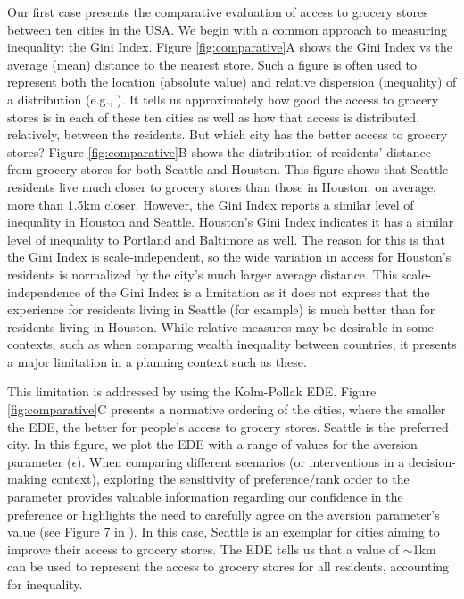 \documentclass[final,3p,times,onecolumn,sort&compress]{elsarticle}
\begin{document}
Our first case presents the comparative evaluation of access to grocery stores between ten cities in the USA.
We begin with a common approach to measuring inequality: the Gini Index.
Figure \ref{fig:comparative}A shows the Gini Index vs the average (mean) distance to the nearest store.
Such a figure is often used to represent both the location (absolute value) and relative dispersion (inequality) of a distribution (e.g., \cite{Adger1997-tu}).
It tells us approximately how good the access to grocery stores is in each of these ten cities as well as how that access is distributed, relatively, between the residents.
But which city has the better access to grocery stores?
Figure \ref{fig:comparative}B shows the distribution of residents' distance from grocery stores for both Seattle and Houston.
This figure shows that Seattle residents live much closer to grocery stores than those in Houston: on average, more than 1.5km closer. 
However, the Gini Index reports a similar level of inequality in Houston and Seattle.
Houston's Gini Index indicates it has a similar level of inequality to Portland and Baltimore as well.
The reason for this is that the Gini Index is scale-independent, so the wide variation in access for Houston's residents is normalized by the city's much larger average distance.
This scale-independence of the Gini Index is a limitation as it does not express that the experience for residents living in Seattle (for example) is much better than for residents living in Houston. 
While relative measures may be desirable in some contexts, such as when comparing wealth inequality between countries, it presents a major limitation in a planning context such as these.

This limitation is addressed by using the Kolm-Pollak EDE.
Figure \ref{fig:comparative}C presents a normative ordering of the cities, where the smaller the EDE, the better for people's access to grocery stores.
Seattle is the preferred city.
In this figure, we plot the EDE with a range of values for the aversion parameter ($\epsilon$).
When comparing different scenarios (or interventions in a decision-making context), exploring the sensitivity of preference/rank order to the parameter provides valuable information regarding our confidence in the preference or highlights the need to carefully agree on the aversion parameter's value (see Figure 7 in \cite{Atkinson1970-mr}).
In this case, Seattle is an exemplar for cities aiming to improve their access to grocery stores.
The EDE tells us that a value of $\sim$1km can be used to represent the access to grocery stores for all residents, accounting for inequality.
\end{document}
